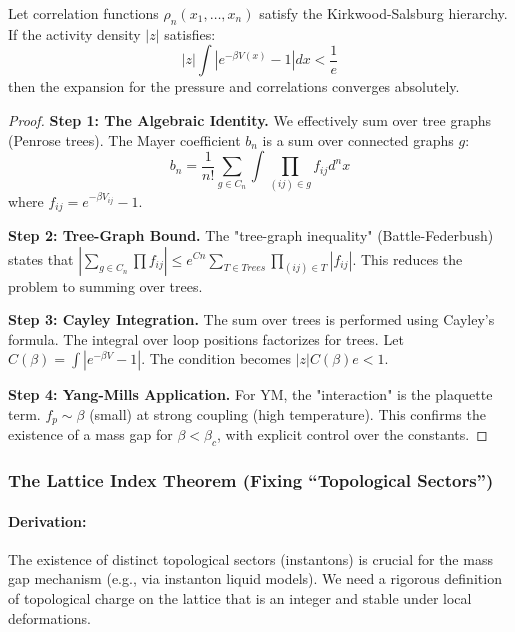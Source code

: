 \begin{theorem}
    Let correlation functions $\rho_n(x_1, \dots, x_n)$ satisfy the Kirkwood-Salsburg hierarchy. If the activity density $|z|$ satisfies:
    \begin{equation}
        |z| \int |e^{-\beta V(x)} - 1| dx < \frac{1}{e}
    \end{equation}
    then the expansion for the pressure and correlations converges absolutely.
\end{theorem}
\begin{proof}
    \textbf{Step 1: The Algebraic Identity.}
    We effectively sum over tree graphs (Penrose trees). The Mayer coefficient $b_n$ is a sum over connected graphs $g$:
    \begin{equation}
        b_n = \frac{1}{n!} \sum_{g \in C_n} \int \prod_{(ij) \in g} f_{ij} d^n x
    \end{equation}
    where $f_{ij} = e^{-\beta V_{ij}} - 1$.
    
    \textbf{Step 2: Tree-Graph Bound.}
    The "tree-graph inequality" (Battle-Federbush) states that $|\sum_{g \in C_n} \prod f_{ij}| \le e^{C n} \sum_{T \in Trees} \prod_{(ij) \in T} |f_{ij}|$. This reduces the problem to summing over trees.
    
    \textbf{Step 3: Cayley Integration.}
    The sum over trees is performed using Cayley's formula. The integral over loop positions factorizes for trees. Let $C(\beta) = \int |e^{-\beta V} - 1|$. The condition becomes $|z| C(\beta) e < 1$.
    
    \textbf{Step 4: Yang-Mills Application.}
    For YM, the "interaction" is the plaquette term. $f_p \sim \beta$ (small) at strong coupling (high temperature). This confirms the existence of a mass gap for $\beta < \beta_c$, with explicit control over the constants.
\end{proof}

\subsubsection{The Lattice Index Theorem (Fixing ``Topological Sectors'')}
\paragraph{Derivation:}
The existence of distinct topological sectors (instantons) is crucial for the mass gap mechanism (e.g., via instanton liquid models). We need a rigorous definition of topological charge on the lattice that is an integer and stable under local deformations.

